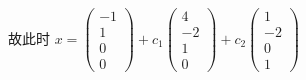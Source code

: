 \begin{enumerate}
                   故此时 \( x = \begin{pmatrix}
                       -1 \\
                       1  \\
                       0  \\
                       0
                   \end{pmatrix} + c_{1}\begin{pmatrix}
                       4  \\
                       -2 \\
                       1  \\
                       0
                   \end{pmatrix} + c_{2}\begin{pmatrix}
                       1  \\
                       -2 \\
                       0  \\
                       1
                   \end{pmatrix} \)
         \end{enumerate}


